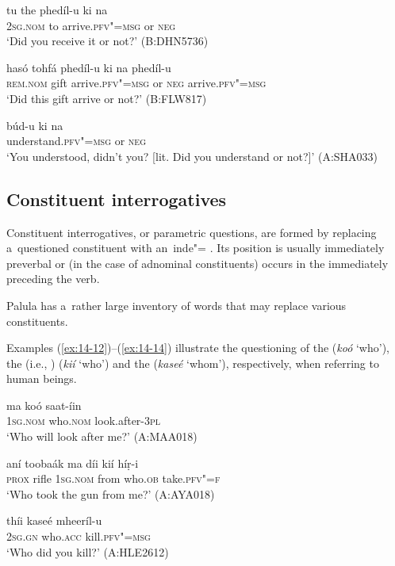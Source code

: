 \begin{exe}
\ex
\label{ex:14-9}
\gll tu the phedíl-u ki na \\
\textsc{2sg.nom} to arrive.\textsc{pfv"=msg} or \textsc{neg} \\
\glt `Did you receive it or not?' (B:DHN5736)

\ex
\label{ex:14-10}
\gll hasó tohfá phedíl-u ki na phedíl-u  \\
\textsc{rem.nom} gift arrive.\textsc{pfv"=msg} or \textsc{neg}  arrive.\textsc{pfv"=msg} \\
\glt `Did this gift arrive or not?' (B:FLW817)

\ex
\label{ex:14-11}
\gll búd-u ki na \\
understand.\textsc{pfv"=msg} or \textsc{neg} \\
\glt `You understood, didn't you? [lit. Did you understand or not?]' (A:SHA033)
\end{exe}
\subsection{Constituent interrogatives}
\label{subsec:14-2-2}

Constituent interrogatives, or parametric questions, are formed by replacing a~questioned constituent with an~inde"= . Its position is usually immediately preverbal or (in the case of adnominal constituents) occurs in the  immediately preceding the verb.


Palula has a~rather large inventory of  words that may replace various constituents.


 Examples (\ref{ex:14-12})--(\ref{ex:14-14}) illustrate the questioning of the   (\textit{koó} `who'), the  (i.e., )  (\textit{kií} `who') and the   (\textit{kaseé} `whom'), respectively, when referring to human beings.

\begin{exe}
\ex
\label{ex:14-12}
\gll ma koó saat-íin \\
\textsc{1sg}.\textsc{nom} who.\textsc{nom} look.after-\textsc{3pl} \\
\glt `Who will look after me?' (A:MAA018)

\ex
\label{ex:14-13}
\gll aní toobaák ma díi kií híṛ-i\\
\textsc{prox} rifle \textsc{1sg.nom} from who.\textsc{ob} take.\textsc{pfv"=f} \\
\glt `Who took the gun from me?' (A:AYA018)

\ex
\label{ex:14-14}
\gll thíi kaseé mheeríl-u \\
\textsc{2sg.gn} who.\textsc{acc} kill.\textsc{pfv"=msg} \\
\glt `Who did you kill?' (A:HLE2612)
\end{exe}

